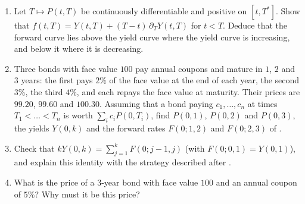 
\begin{exercise}\label{ex:ir-bootstrap}
\easy
\begin{enumerate}[label=(\alph*)]
  \item Let $T\mapsto P(t,T)$ be continuously differentiable and positive on $[t,T^*]$. Show that
    $f(t,T)=Y(t,T)+(T-t)\,\partial_TY(t,T)$ for $t<T$. Deduce that the forward curve lies above the
    yield curve where the yield curve is increasing, and below it where it is decreasing.
  \item Three bonds with face value $100$ pay annual coupons and mature in $1$, $2$ and $3$ years:
    the first pays $2\%$ of the face value at the end of each year, the second $3\%$, the third $4\%$,
    and each repays the face value at maturity. Their prices are $99.20$, $99.60$ and $100.30$.
    Assuming that a bond paying $c_1,\dots,c_n$ at times $T_1<\dots<T_n$ is worth
    $\sum_ic_iP(0,T_i)$, find $P(0,1)$, $P(0,2)$ and $P(0,3)$, the yields $Y(0,k)$ and the forward
    rates $F(0;1,2)$ and $F(0;2,3)$ of .
  \item Check that $kY(0,k)=\sum_{j=1}^kF(0;j-1,j)$ (with $F(0;0,1)=Y(0,1)$), and explain this
    identity with the strategy described after .
  \item What is the price of a $3$-year bond with face value $100$ and an annual coupon of $5\%$?
    Why must it be this price?
\end{enumerate}
\end{exercise}

